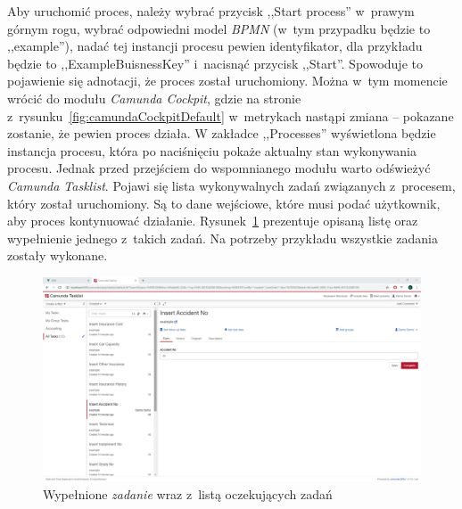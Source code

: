 Aby uruchomić proces, należy wybrać przycisk ,,Start process'' w~prawym górnym rogu, wybrać odpowiedni model \emph{BPMN} (w~tym przypadku będzie to ,,example''), nadać tej instancji procesu pewien identyfikator, dla przykładu będzie to ,,ExampleBuisnessKey'' i~nacisnąć przycisk ,,Start''. Spowoduje to pojawienie się adnotacji, że proces został uruchomiony. Można w~tym momencie wrócić do modułu \emph{Camunda Cockpit}, gdzie na stronie z~rysunku~\ref{fig:camundaCockpitDefault} w~metrykach nastąpi zmiana -- pokazane zostanie, że pewien proces działa. W zakładce ,,Processes'' wyświetlona będzie instancja procesu, która po naciśnięciu pokaże aktualny stan wykonywania procesu. Jednak przed przejściem do wspomnianego modułu warto odświeżyć \emph{Camunda Tasklist}. Pojawi się lista wykonywalnych zadań związanych z~procesem, który został uruchomiony. Są to dane wejściowe, które musi podać użytkownik, aby proces kontynuować działanie. Rysunek~\ref{fig:camundaTasklistTask} prezentuje opisaną listę oraz wypełnienie jednego z~takich zadań. Na potrzeby przykładu wszystkie zadania zostały wykonane.
\begin{figure}
    \centering
    \includegraphics[width=\textwidth]{./assets/camundaTasklistTask.png}
    \caption{Wypełnione \emph{zadanie} wraz z~listą oczekujących zadań}
    \label{fig:camundaTasklistTask}
\end{figure}

